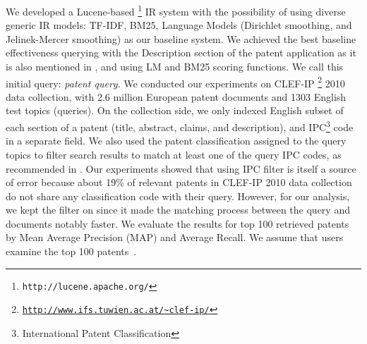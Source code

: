 We developed a Lucene-based%
\footnote{\texttt{http://lucene.apache.org/}%
} IR system with the possibility of using diverse generic IR models: TF-IDF, BM25, Language Models (Dirichlet smoothing, and Jelinek-Mercer smoothing) as our baseline system. We achieved the best baseline effectiveness querying with the Description section of the patent application as it is also mentioned in \cite{xue2009transforming}, and using LM and BM25 scoring functions. We call this initial query: {\em patent query}. We conducted our experiments on CLEF-IP%
\footnote{\texttt{\url{http://www.ifs.tuwien.ac.at/~clef-ip/}}}%
 2010 data collection, with 2.6 million European patent documents and 1303 English test topics (queries). On the collection side, we only indexed English subset of each section of a patent (title, abstract, claims, and description), and IPC\footnote{International Patent Classification}%
  code in a separate field. We also used the patent classification assigned to the query topics to filter search results to match at least one of the query IPC codes, as recommended in \cite{lopez2010patatras}. Our experiments showed that using IPC filter is itself a source of error because about 19\% of relevant patents in CLEF-IP 2010 data collection do not share any classification code with their query. However, for our analysis, we kept the filter on since it made the matching process between the query and documents notably faster. We evaluate the results for top 100 retrieved patents by Mean Average Precision (MAP) and Average Recall. We assume that users examine the top 100 patents~\cite{joho2010survey}.
